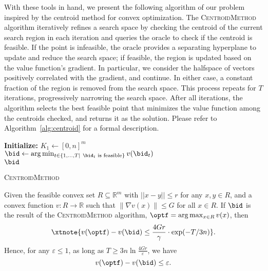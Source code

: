 With these tools in hand, we present the following algorithm of our problem inspired by the centroid method for convex optimization. The \textsc{CentroidMethod} algorithm iteratively refines a search space by checking the centroid of the current search region in each iteration and queries the oracle to check if the centroid is feasible. If the point is infeasible, the oracle provides a separating hyperplane to update and reduce the search space; if feasible, the region is updated based on the value function's gradient. In particular, we consider the halfspace
of vectors positively correlated with the gradient, and continue. In either case, a constant fraction of the region is removed from the search space. This process repeats for \( T \) iterations, progressively narrowing the search space. After all iterations, the algorithm selects the best feasible point that minimizes the value function among the centroids checked, and returns it as the solution. Please refer to Algorithm~\ref{alg:centroid} for a formal description.

\begin{algorithm}
\SetAlgoLined
{}
\textbf{Initialize:} $K_1 \leftarrow [0,n]^m$\\
$\bid \leftarrow \arg\min_{t \in \{1, \ldots, T|\ \bid_t \text{ is feasible}\}} v(\bid_t)$\\
\Return $\bid$
\caption{\textsc{CentroidMethod}}
\label{alg:centroid}
\end{algorithm}





\begin{theorem}
Given the feasible convex set $R \subseteq \mathbb{R}^m$ with $||x - y|| \leq r$ for any $x,y \in R$, and a convex function $v : R \rightarrow \mathbb{R}$ such that $\|\nabla v(x)\| \leq G$ for all $x \in R$. If $\bid$ is the result of the \textsc{CentroidMethod} algorithm,  $\optf = \arg\max_{x \in R} v(x)$,  then
\[
\xtnote{v(\optf) - v(\bid)  \leq \frac{4Gr}{\gamma} \cdot \exp(-T/3n)}.
\]
Hence, for any $\varepsilon \leq 1$, as long as $T \geq 3n \ln \frac{4Gr}{\varepsilon}$, we have
\[
 v(\optf) - v(\bid) \leq \varepsilon.
\]
\end{theorem}

